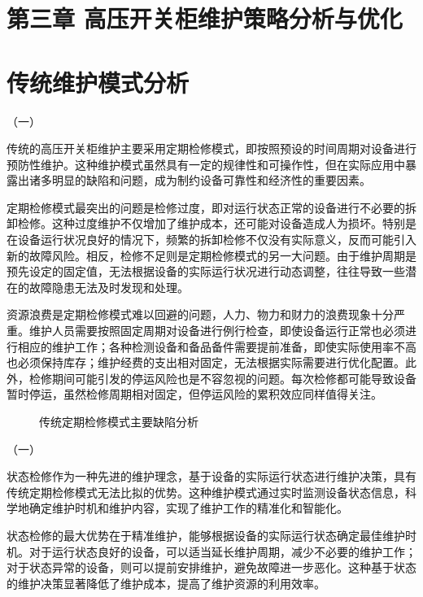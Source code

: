 \section{第三章 高压开关柜维护策略分析与优化}

\section{传统维护模式分析}

（一）

传统的高压开关柜维护主要采用定期检修模式，即按照预设的时间周期对设备进行预防性维护。这种维护模式虽然具有一定的规律性和可操作性，但在实际应用中暴露出诸多明显的缺陷和问题，成为制约设备可靠性和经济性的重要因素。

定期检修模式最突出的问题是检修过度，即对运行状态正常的设备进行不必要的拆卸检修。这种过度维护不仅增加了维护成本，还可能对设备造成人为损坏。特别是在设备运行状况良好的情况下，频繁的拆卸检修不仅没有实际意义，反而可能引入新的故障风险。相反，检修不足则是定期检修模式的另一大问题。由于维护周期是预先设定的固定值，无法根据设备的实际运行状况进行动态调整，往往导致一些潜在的故障隐患无法及时发现和处理。

资源浪费是定期检修模式难以回避的问题，人力、物力和财力的浪费现象十分严重。维护人员需要按照固定周期对设备进行例行检查，即使设备运行正常也必须进行相应的维护工作；各种检测设备和备品备件需要提前准备，即使实际使用率不高也必须保持库存；维护经费的支出相对固定，无法根据实际需要进行优化配置。此外，检修期间可能引发的停运风险也是不容忽视的问题。每次检修都可能导致设备暂时停运，虽然检修周期相对固定，但停运风险的累积效应同样值得关注。

\begin{figure}[h]
\centering
\caption{传统定期检修模式主要缺陷分析}
\label{fig:traditional_maintenance_problems}
\end{figure}

（一）

状态检修作为一种先进的维护理念，基于设备的实际运行状态进行维护决策，具有传统定期检修模式无法比拟的优势。这种维护模式通过实时监测设备状态信息，科学地确定维护时机和维护内容，实现了维护工作的精准化和智能化。

状态检修的最大优势在于精准维护，能够根据设备的实际运行状态确定最佳维护时机。对于运行状态良好的设备，可以适当延长维护周期，减少不必要的维护工作；对于状态异常的设备，则可以提前安排维护，避免故障进一步恶化。这种基于状态的维护决策显著降低了维护成本，提高了维护资源的利用效率。

